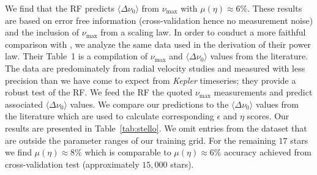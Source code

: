 We find that the RF predicts ${\langle\Delta\nu_0\rangle}$  from $\nu_{\max}$  with ${\mu (\eta) \approx 6\%}$. These results are based on error free information (cross-validation hence no measurement noise) and the inclusion of $\nu_{\max}$ from a scaling law. 
In order to conduct a more faithful comparison with \citet{2009MNRAS.400L..80S}, we analyze the same data used in the derivation of their power law.  
Their Table~1 is a compilation of  $\nu_{\max}$ and ${\langle\Delta\nu_0\rangle}$ values from the literature. The data are predominately from radial velocity studies and measured with less precision than we have come to expect from \emph{Kepler} timeseries; they provide a robust test of the RF. 
We feed the RF the quoted $\nu_{\max}$ measurements and predict associated ${\langle\Delta\nu_0\rangle}$ values. We compare our predictions to the ${\langle\Delta\nu_0\rangle}$ values from the literature which are used to calculate corresponding 
$\epsilon$ and $\eta$ scores. Our results are presented in Table~\ref{tab:stello}. 
We omit entries from  the \citet{2009MNRAS.400L..80S} dataset that are outside the parameter ranges of our training grid.
For the remaining $17$ stars we find ${\mu (\eta) \approx 8\%}$ which is comparable to  ${\mu (\eta) \approx 6\%}$ accuracy achieved from cross-validation test (approximately $15,000$ stars).  

